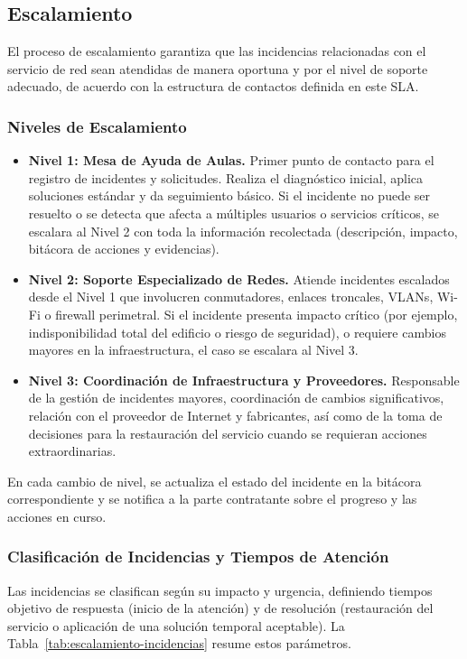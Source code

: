\subsection{Escalamiento}

El proceso de escalamiento garantiza que las incidencias relacionadas con el servicio de red sean atendidas de manera oportuna y por el nivel de soporte adecuado, de acuerdo con la estructura de contactos definida en este SLA.

\subsubsection*{Niveles de Escalamiento}
\begin{itemize}
    \item \textbf{Nivel 1: Mesa de Ayuda de Aulas.} Primer punto de contacto para el registro de incidentes y solicitudes. Realiza el diagnóstico inicial, aplica soluciones estándar y da seguimiento básico. Si el incidente no puede ser resuelto o se detecta que afecta a múltiples usuarios o servicios críticos, se escalara al Nivel 2 con toda la información recolectada (descripción, impacto, bitácora de acciones y evidencias).
    \item \textbf{Nivel 2: Soporte Especializado de Redes.} Atiende incidentes escalados desde el Nivel 1 que involucren conmutadores, enlaces troncales, VLANs, Wi-Fi o firewall perimetral. Si el incidente presenta impacto crítico (por ejemplo, indisponibilidad total del edificio o riesgo de seguridad), o requiere cambios mayores en la infraestructura, el caso se escalara al Nivel 3.
    \item \textbf{Nivel 3: Coordinación de Infraestructura y Proveedores.} Responsable de la gestión de incidentes mayores, coordinación de cambios significativos, relación con el proveedor de Internet y fabricantes, así como de la toma de decisiones para la restauración del servicio cuando se requieran acciones extraordinarias.
\end{itemize}

En cada cambio de nivel, se actualiza el estado del incidente en la bitácora correspondiente y se notifica a la parte contratante sobre el progreso y las acciones en curso.

\subsubsection*{Clasificación de Incidencias y Tiempos de Atención}
Las incidencias se clasifican según su impacto y urgencia, definiendo tiempos objetivo de respuesta (inicio de la atención) y de resolución (restauración del servicio o aplicación de una solución temporal aceptable). La Tabla~\ref{tab:escalamiento-incidencias} resume estos parámetros.

